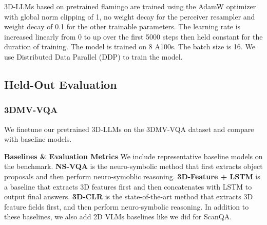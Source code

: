 3D-LLMs based on pretrained flamingo are trained using the AdamW optimizer with global norm
clipping of 1, no weight decay for the perceiver resampler and weight decay of 0.1 for the other
trainable parameters. The learning rate is increased linearly from 0 to  up over the first 5000 steps
then held constant for the duration of training. The model is trained on 8 A100s. The batch size is 16. We use Distributed Data Parallel (DDP) to train the model.
\subsection{Held-Out Evaluation}
\subsubsection{3DMV-VQA}
We finetune our pretrained 3D-LLMs on the 3DMV-VQA dataset and compare with baseline models.

\textbf{Baselines \& Evaluation Metrics} We include representative baseline models on the benchmark. 
\textbf{NS-VQA} is the neuro-symbolic method that first extracts object proposals and then perform neuro-symoblic reasoning. \textbf{3D-Feature + LSTM} is a baseline that extracts 3D features first and then concatenates with LSTM to output final answers. \textbf{3D-CLR} is the state-of-the-art method that extracts 3D feature fields first, and then perform neuro-symbolic reasoning. In addition to these baselines, we also add 2D VLMs baselines like we did for ScanQA.


